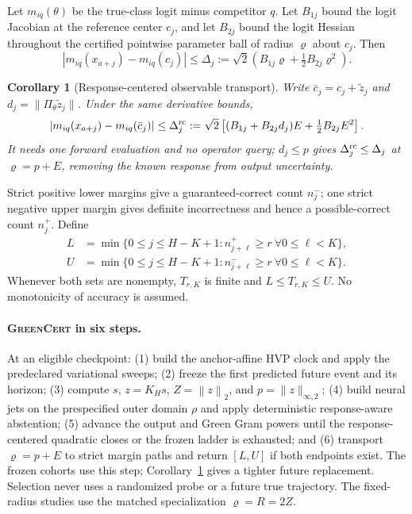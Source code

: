 \documentclass{article}
\newtheorem{corollary}{Corollary}
\newcommand{\norm}[1]{\left\lVert #1\right\rVert_2}
\newcommand{\method}{\textsc{GreenCert}}
\begin{document}
Let $m_{iq}(\theta)$ be the true-class logit minus competitor $q$.  Let $B_{1j}$
bound the logit Jacobian at the reference center $c_j$, and let $B_{2j}$ bound
the logit Hessian throughout the certified pointwise parameter ball of radius
$\varrho$ about $c_j$.  Then
\begin{equation}
 |m_{iq}(x_{a+j})-m_{iq}(c_j)|
 \le \Delta_j:=\sqrt2\left(B_{1j}\varrho
 +\tfrac12B_{2j}\varrho^2\right).
 \label{eq:marginradius}
\end{equation}
\begin{corollary}[Response-centered observable transport]
\label{cor:output-recenter}
Write $\bar c_j=c_j+\widetilde z_j$ and
$d_j=\|\Pi_\theta\widetilde z_j\|$.  Under the same derivative bounds,
\begin{equation}
 \left|m_{iq}(x_{a+j})-m_{iq}(\bar c_j)\right|
 \le \Delta^{\rm rc}_j:=\sqrt2\left[
 (B_{1j}+B_{2j}d_j)E+\tfrac12B_{2j}E^2\right].
 \label{eq:recentered-marginradius}
\end{equation}
It needs one forward evaluation and no operator query; $d_j\le p$ gives
$\Delta^{\rm rc}_j\le\Delta_j$ at $\varrho=p+E$, removing the known response
from output uncertainty.
\end{corollary}
Strict positive lower margins give a guaranteed-correct count $n^-_j$; one
strict negative upper margin gives definite incorrectness and hence a
possible-correct count $n^+_j$.  Define
\begin{align}
 L&=\min\{0\le j\le H-K+1:
 n^+_{j+\ell}\ge r\ \forall 0\le\ell<K\},\nonumber\\
 U&=\min\{0\le j\le H-K+1:
 n^-_{j+\ell}\ge r\ \forall 0\le\ell<K\}.
 \label{eq:persistentbracket}
\end{align}
Whenever both sets are nonempty, $T_{r,K}$ is finite and
$L\le T_{r,K}\le U$.  No monotonicity of accuracy is assumed.

\paragraph{\method{} in six steps.}
At an eligible checkpoint: (1) build the anchor-affine HVP clock and apply the
predeclared variational sweeps; (2) freeze the first predicted future event and
its horizon; (3) compute $s$, $z=K_Hs$, $Z=\norm{z}$, and
$p=\|z\|_{\infty,2}$; (4) build neural jets on the prespecified outer domain
$\rho$ and apply deterministic response-aware abstention; (5) advance the
output and Green Gram powers until the response-centered quadratic closes or
the frozen ladder is exhausted; and (6) transport $\varrho=p+E$ to strict margin
paths and return $[L,U]$ if both endpoints exist.  The frozen cohorts use this
step; Corollary~\ref{cor:output-recenter} gives a tighter future replacement.  Selection never
uses a randomized probe or a future true trajectory.  The fixed-radius studies
use the matched specialization $\varrho=R=2Z$.
\end{document}
